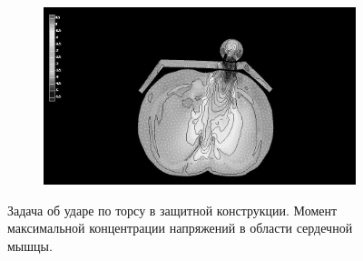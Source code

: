 \begin{figure}[H]
\centering
\begin{subfigure}[b]{0.6\textwidth}
\centering
\includegraphics[width=\textwidth]{png/cranium/chest-res-06-bw.png}
\end{subfigure}
\caption{Задача об ударе по торсу в защитной конструкции. Момент максимальной концентрации напряжений в области сердечной мышцы.}
\label{pic:chest_res}
\end{figure}


